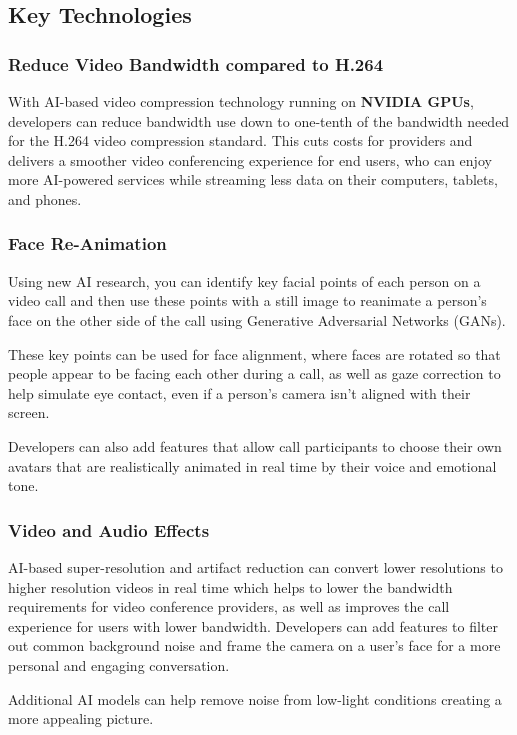 \subsection{Key Technologies}

\subsubsection{Reduce Video Bandwidth compared to H.264}
With AI-based video compression technology running on \textbf{NVIDIA GPUs}, 
developers can reduce bandwidth use down to one-tenth of the bandwidth needed 
for the H.264 video compression standard. This cuts costs for providers and 
delivers a smoother video conferencing experience for end users, who can enjoy 
more AI-powered services while streaming less data on their computers, tablets, and phones.

\subsubsection{Face Re-Animation}
Using new AI research, you can identify key facial points of each person on a video call 
and then use these points with a still image to reanimate a person’s face on the other side 
of the call using Generative Adversarial Networks (GANs).

These key points can be used for face alignment, where faces are rotated so that
people appear to be facing each other during a call, as well as gaze correction 
to help simulate eye contact, even if a person’s camera isn’t aligned with their screen.

Developers can also add features that allow call participants to choose their
own avatars that are realistically animated in real time by their voice and emotional tone.

\subsubsection{Video and Audio Effects}
AI-based super-resolution and artifact reduction can convert lower resolutions to higher
resolution videos in real time which helps to lower the bandwidth requirements for video 
conference providers, as well as improves the call experience for users with lower bandwidth. 
Developers can add features to filter out common background noise and frame the camera on a user’s 
face for a more personal and engaging conversation.

Additional AI models can help remove noise from low-light conditions creating a more appealing picture.

